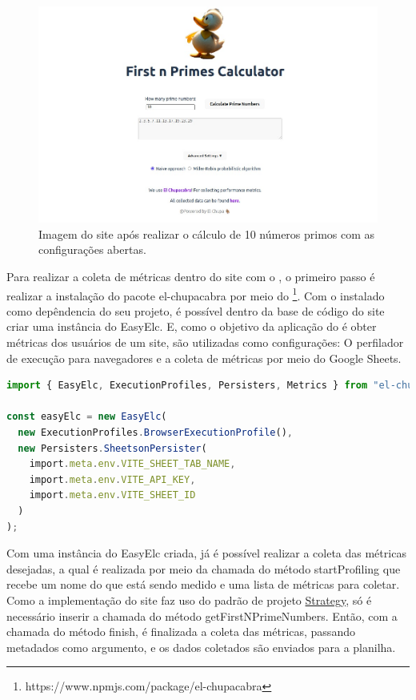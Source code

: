 \documentclass[12pt]{tcc}
\begin{document}
\begin{figure}[!ht]
	\centering
	\includegraphics[width=1\textwidth]{figures/print-elc-numeros-primos.jpeg}
	\caption{Imagem do site após realizar o cálculo de 10 números primos com as configurações abertas.}
	\label{fig:site-numeros-primos}
\end{figure}

Para realizar a coleta de métricas dentro do site com o , o primeiro passo é realizar a instalação do pacote el-chupacabra por meio do \footnote{https://www.npmjs.com/package/el-chupacabra}.
Com o  instalado como depêndencia do seu projeto, é possível dentro da base de código do site criar uma instância do EasyElc.
E, como o objetivo da aplicação do  é obter métricas dos usuários de um site, são utilizadas como configurações: O perfilador de execução para navegadores e a coleta de métricas por meio do Google Sheets.

\begin{minipage}{\linewidth}


\begin{lstlisting}[label={lst:easyelc_setup}, caption={Instância do módulo EasyElc no site Calculadora dos Primeiros n Números Primos.}, language=TypeScript, breaklines=true]
import { EasyElc, ExecutionProfiles, Persisters, Metrics } from "el-chupacabra"

const easyElc = new EasyElc(
  new ExecutionProfiles.BrowserExecutionProfile(),
  new Persisters.SheetsonPersister(
    import.meta.env.VITE_SHEET_TAB_NAME,
    import.meta.env.VITE_API_KEY,
    import.meta.env.VITE_SHEET_ID
  )
);
\end{lstlisting}

\end{minipage}
Com uma instância do EasyElc criada, já é possível realizar a coleta das métricas desejadas, a qual é realizada por meio da chamada do método startProfiling que recebe um nome do que está sendo medido e uma lista de métricas para coletar.
Como a implementação do site faz uso do padrão de projeto \hyperref[subsection:strategy]{Strategy}, só é necessário inserir a chamada do método getFirstNPrimeNumbers.
Então, com a chamada do método finish, é finalizada a coleta das métricas, passando metadados como argumento, e os dados coletados são enviados para a planilha.
\end{document}
